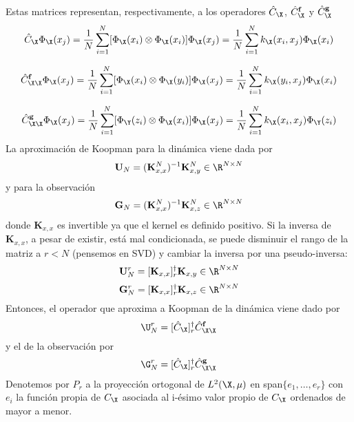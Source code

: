 \noindent Estas matrices representan, respectivamente, a los operadores $\hat{C}_\X$, $\hat{C}^{\mathbf{f}}_\X$ y $\hat{C}^{\mathbf{g}}_\X$
\begin{equation*}
    \hat{C}_\X \Phi_\X (x_j) = \frac{1}{N} \sum_{i=1}^N [\Phi_\X (x_i) \otimes \Phi_\X (x_i)] \Phi_\X (x_j) = \frac{1}{N} \sum_{i=1}^N k_\X (x_i, x_j) \Phi_\X (x_i)
\end{equation*}

\begin{equation*}
    \hat{C}_{\X \X}^{\mathbf{f}} \Phi_\X (x_j) = \frac{1}{N} \sum_{i=1}^N [\Phi_\X (x_i) \otimes \Phi_\X (y_i)] \Phi_\X (x_j) = \frac{1}{N} \sum_{i=1}^N k_\X (y_i, x_j) \Phi_\X (x_i)
\end{equation*}

\begin{equation*}
    \hat{C}_{\X \X}^{\mathbf{g}} \Phi_\X (x_j) = \frac{1}{N} \sum_{i=1}^N [\Phi_\Y (z_i) \otimes \Phi_\X (x_i)] \Phi_\X (x_j) = \frac{1}{N} \sum_{i=1}^N k_\X (x_i, x_j) \Phi_\Y(z_i)
\end{equation*}
La aproximación de Koopman para la dinámica viene dada por
    \begin{equation*}
        \mathbf{U}_N = (\mathbf{K}^N_{x,x})^{-1} \mathbf{K}^N_{x,y} \in \R^{N \times N}
    \end{equation*}
    y para la observación
    \begin{equation*}
        \mathbf{G}_N = (\mathbf{K}^N_{x,x})^{-1} \mathbf{K}^N_{x,z} \in \R^{N \times N}
    \end{equation*}
    donde $\mathbf{K}_{x,x}$ es invertible ya que el kernel es definido positivo.
Si la inversa de $\mathbf{K}_{x,x}$, a pesar de existir, está mal condicionada, se puede disminuir el rango de la matriz a $r < N$ (pensemos en SVD) y cambiar la inversa por una pseudo-inversa:
\begin{equation*}
    \mathbf{U}_N^r = [\mathbf{K}_{x,x}]^{\dagger}_r \mathbf{K}_{x,y}  \in \R^{N \times N}
\end{equation*}
\begin{equation*}
    \mathbf{G}_N^r = [\mathbf{K}_{x,x}]^{\dagger}_r \mathbf{K}_{x,z}  \in \R^{N \times N}
\end{equation*}
Entonces, el operador que aproxima a Koopman de la dinámica viene dado por 
\begin{equation*}
    \U_N^r = [\hat{C}_\X]^{\dagger}_r \hat{C}_{\X \X}^{\mathbf{f}}
\end{equation*}
y el de la observación por
\begin{equation*}
    \G_N^r = [\hat{C}_\X]^{\dagger}_r \hat{C}_{\X \X}^\mathbf{g}
\end{equation*}
Denotemos por $P_r$ a la proyección ortogonal de $L^2(\X, \mu)$ en span$\{ e_1, \dots, e_r \}$ con $e_i$ la función propia de $C_\X$ asociada al i-ésimo valor propio de $C_\X$ ordenados de mayor a menor.

